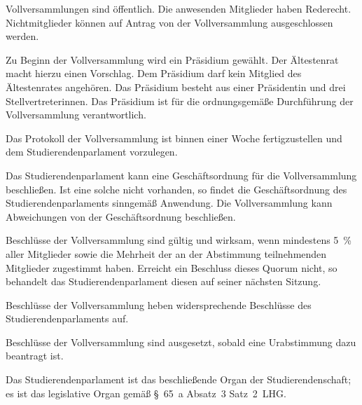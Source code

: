 \begin{jurdoc}
Vollversammlungen sind öffentlich. Die anwesenden Mitglieder haben Rederecht. Nichtmitglieder können auf Antrag von der Vollversammlung ausgeschlossen werden.

Zu Beginn der Vollversammlung wird ein Präsidium gewählt. Der Ältestenrat macht hierzu einen Vorschlag. Dem Präsidium darf kein Mitglied des Ältestenrates angehören. Das Präsidium besteht aus einer Präsidentin und drei Stellvertreterinnen. Das Präsidium ist für die ordnungsgemäße Durchführung der Vollversammlung verantwortlich.

Das Protokoll der Vollversammlung ist binnen einer Woche fertigzustellen und dem Studierendenparlament vorzulegen.

Das Studierendenparlament kann eine Geschäftsordnung für die Vollversammlung beschließen. Ist eine solche nicht vorhanden, so findet die Ge\-schäfts\-ord\-nung des Studierendenparlaments sinngemäß Anwendung. Die Vollversammlung kann Abweichungen von der Geschäftsordnung beschließen.




Beschlüsse der Vollversammlung sind gültig und wirksam, wenn mindestens 5~\% aller Mitglieder sowie die Mehrheit der an der Abstimmung teilnehmenden Mitglieder zugestimmt haben. Erreicht ein Beschluss dieses Quorum nicht, so behandelt das Studierendenparlament diesen auf seiner nächsten Sitzung.

Beschlüsse der Vollversammlung heben widersprechende Beschlüsse des Studierendenparlaments auf.

Beschlüsse der Vollversammlung sind ausgesetzt, sobald eine Urabstimmung dazu beantragt ist.


%
%


Das Studierendenparlament ist das beschließende Organ der Studierendenschaft; es ist das legislative Organ gemäß §~65~a Absatz~3 Satz~2~LHG.


\end{jurdoc}
